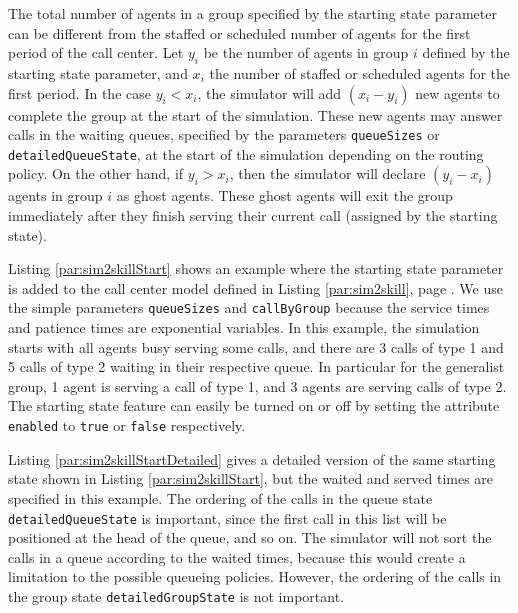 The total number of agents in a group specified by the starting state parameter can
be different from the staffed or scheduled number of agents for the first period
of the call center.
Let $y_i$ be the number of agents in group $i$ defined by the starting state parameter,
and $x_i$ the number of staffed or scheduled agents for the first period.
In the case $y_i < x_i$,
the simulator will add $(x_i-y_i)$ new agents to complete the group at the start of the simulation.
These new agents may answer calls in the waiting queues, specified by the parameters
\texttt{queueSizes} or \texttt{detailed\-Queue\-State}, at the start of the simulation
depending on the routing policy.
On the other hand, if $y_i > x_i$,
then the simulator will declare $(y_i-x_i)$ agents in group $i$ as ghost agents.
These ghost agents will exit the group immediately after they finish serving their 
current call (assigned by the starting state).




Listing \ref{par:sim2skillStart} shows an example where the starting state
parameter is added to the call center model defined in Listing \ref{par:sim2skill},
page \pageref{par:sim2skill}.
We use the simple parameters \texttt{queueSizes} and \texttt{callByGroup} because
the service times and patience times are exponential variables.
In this example, the simulation starts with 
all agents busy serving some calls, and there are
3 calls of type 1 and 5 calls of type 2 waiting in their respective queue.
In particular for the generalist group, 1 agent is serving a call of type 1, and 3 agents
are serving calls of type 2.
The starting state feature can easily be turned on or off by setting the attribute
\texttt{enabled} to \texttt{true} or \texttt{false} respectively.




Listing \ref{par:sim2skillStartDetailed} gives a detailed version of
the same starting state shown in Listing \ref{par:sim2skillStart}, but the
waited and served times are specified in this example.
The ordering of the calls in the queue state \texttt{detailedQueueState} is important,
since the first call in this list will be positioned at the head of the queue, and so on.
The simulator will not sort the calls in a queue according to the waited times,
because this would create a limitation to the possible queueing policies.
However, the ordering of the calls in the group state \texttt{detailedGroupState} is not important.

